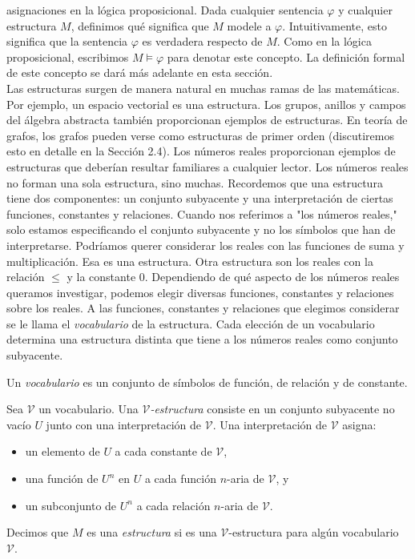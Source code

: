 \message{ !name(main.tex)}\documentclass[12pt,a4paper]{book}
\newcommand{\comillas}[1]{"#1"}
\newcommand{\VV}{\mathcal{V}}
\begin{document}
    asignaciones en la lógica proposicional. Dada cualquier sentencia $\varphi$ y cualquier estructura $M$, definimos qué
    significa que $M$ modele a $\varphi$. Intuitivamente, esto significa que la sentencia $\varphi$ es verdadera respecto de
    $M$. Como en la lógica proposicional, escribimos $M\models\varphi$ para denotar este concepto. La definición formal de
    este concepto se dará más adelante en esta sección.\\
    Las estructuras surgen de manera natural en muchas ramas de las matemáticas. Por ejemplo, un espacio vectorial es una
    estructura. Los grupos, anillos y campos del álgebra abstracta también proporcionan ejemplos de estructuras. En teoría
    de grafos, los grafos pueden verse como estructuras de primer orden (discutiremos esto en detalle en la Sección 2.4). Los
    números reales proporcionan ejemplos de estructuras que deberían resultar familiares a cualquier lector. Los números
    reales no forman una sola estructura, sino muchas. Recordemos que una estructura tiene dos componentes: un conjunto
    subyacente y una interpretación de ciertas funciones, constantes y relaciones. Cuando nos referimos a \comillas{los
    números reales,} solo estamos especificando el conjunto subyacente y no los símbolos que han de interpretarse. Podríamos
    querer considerar los reales con las funciones de suma y multiplicación. Esa es una estructura. Otra estructura son los
    reales con la relación $\leq$ y la constante 0. Dependiendo de qué aspecto de los números reales queramos investigar,
    podemos elegir diversas funciones, constantes y relaciones sobre los reales. A las funciones, constantes y relaciones
    que elegimos considerar se le llama el \textit{vocabulario} de la estructura. Cada elección de un vocabulario determina
    una estructura distinta que tiene a los números reales como conjunto subyacente.

    \begin{definicion}[Vocabulario]\label{def:vocabulario}
        Un \textit{vocabulario} es un conjunto de símbolos de función, de relación y de constante.
    \end{definicion}

    \begin{definicion}[$\VV$-estructura]\label{def:v-estructura}
        Sea $\VV$ un vocabulario. Una \textit{$\VV$-estructura} consiste en un conjunto subyacente no vacío $U$ junto con
        una interpretación de $\VV$. Una interpretación de $\VV$ asigna:
        \begin{itemize}
            \item[$\bullet$] un elemento de $U$ a cada constante de $\VV$,
            \item[$\bullet$] una función de $U^{n}$ en $U$ a cada función $n$-aria de $\VV$, y
            \item[$\bullet$] un subconjunto de $U^{n}$ a cada relación $n$-aria de $\VV$.
        \end{itemize}
        Decimos que $M$ es una \textit{estructura} si es una $\VV$-estructura para algún vocabulario $\VV$.
    \end{definicion}
\end{document}
